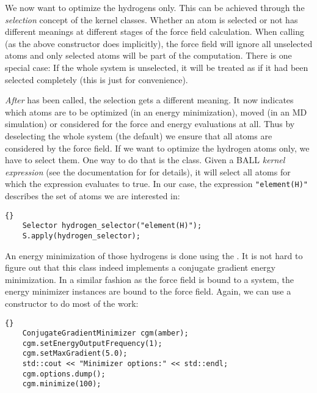 We now want to optimize the hydrogens only. This can be achieved through the
{\em selection} concept of the kernel classes. Whether an atom is selected or
not has different meanings at different stages of the force field calculation.
When calling  (as the above constructor does implicitly),
the force field will ignore all unselected atoms and only selected atoms will
be part of the computation. There is one special case: If the whole system is
unselected, it will be treated as if it had been selected completely (this is
just for convenience).

{\em After}  has been called, the selection gets a different
meaning. It now indicates which atoms are to be optimized (in an energy
minimization), moved (in an MD simulation) or considered for the force and
energy evaluations at all. Thus by deselecting the whole system (the default)
we ensure that all atoms are considered by the force field. If we want to
optimize the hydrogen atoms only, we have to select them. One way to do that
is the  class. Given a BALL {\em kernel expression} (see the
documentation for  for details), it will select all atoms
for which the expression evaluates to true. In our case, the expression 
{\tt "element(H)"} describes the set of atoms we are interested in:

\begin{lstlisting}{}
	Selector hydrogen_selector("element(H)");
	S.apply(hydrogen_selector);
\end{lstlisting}

\noindent
An energy minimization of those hydrogens is done using the
. It is not hard to figure out that this
class indeed implements a conjugate gradient energy minimization.
In a similar fashion as the force field is bound to a system, the 
energy minimizer instances are bound to the force field. Again, we can use a
constructor to do most of the work:

\begin{lstlisting}{}
	ConjugateGradientMinimizer cgm(amber);
	cgm.setEnergyOutputFrequency(1);
	cgm.setMaxGradient(5.0);
	std::cout << "Minimizer options:" << std::endl;
	cgm.options.dump();
	cgm.minimize(100);
\end{lstlisting}

